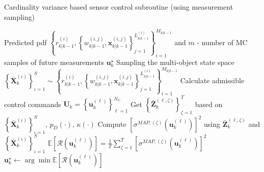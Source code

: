 \documentclass[twocolumn]{autart}
\begin{document}
\begin{algorithm}[htb]
\caption{Cardinality variance based sensor control subroutine (using measurement sampling)}
\label{alg3}
\begin{algorithmic}[1]
    \Require Predicted pdf $\left\lbrace r_{k|k-1}^{(i)}, \left\lbrace w_{k|k-1}^{(i,j)},\mathbf{x}_{k|k-1}^{(i,j)}\right\rbrace_{j=1}^{L_{k|k-1}^{(i)}}\right\rbrace_{i=1}^{M_{k|k-1}}$ and $m$ - number of MC samples of future measurements
    \Ensure $\mathbf{u}_k^\star$
    \State Sampling the multi-object state space
    \Statex \quad \; $\left\{\mathbf{\bar{X}}_{k}^{(\iota)}\right\}_{\iota=1}^{S} \sim \left\lbrace r_{k|k-1}^{(i)}, \left\lbrace w_{k|k-1}^{(i,j)},\mathbf{x}_{k|k-1}^{(i,j)}\right\rbrace_{j=1}^{L_{k|k-1}^{(i)}}\right\rbrace_{i=1}^{M_{k|k-1}}$
    \State Calculate admissible control commands $\mathbf{U}_k=\left\{\mathbf{u}_k^{(\ell)}\right\}_{\ell=1}^{N_U}$
    \State Get $\left\{\mathbf{\bar{Z}}_{k}^{(\ell,\zeta)}\right\}_{\zeta=1}^{T}$ based on $\left\{\mathbf{\bar{X}}_{k}^{(\iota)}\right\}_{\iota=1}^{S}$, $p_D(\cdot)$, $\kappa(\cdot)$
    \State Compute $\left[\sigma^{MAP,(\zeta)}\left(\mathbf{u}_k^{(\ell)}\right)\right]^2$ using $\mathbf{\bar{Z}}_{k}^{(\ell,\zeta)}$ and
    \Statex \qquad\qquad\; $\left\{\mathbf{\bar{X}}_{k}^{(\iota)}\right\}_{\iota=1}^{S}$
    \EndFor
\State $\mathbb{E}\left[\mathcal{R}\left(\mathbf{u}_k^{(\ell)}\right)\right] = \frac{1}{T}\sum_{\zeta=1}^{T} \left[\sigma^{MAP,(\zeta)}\left(\mathbf{u}_k^{(\ell)}\right)\right]^2$
     \EndFor
    \State $\mathbf{u}_k^\star \gets \arg\min \mathbb{E}\left[\mathcal{R}\left(\mathbf{u}_k^{(\ell)}\right)\right]$
\end{algorithmic}
\end{algorithm}
\end{document}
